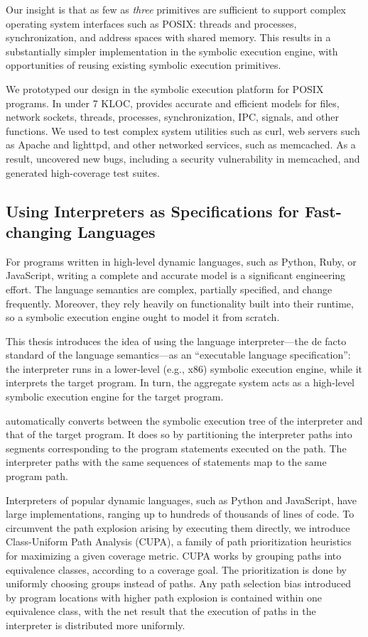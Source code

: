 Our insight is that as few as \emph{three} primitives are sufficient to support complex operating system interfaces such as POSIX: threads and processes, synchronization, and address spaces with shared memory.
%
This results in a substantially simpler implementation in the symbolic execution engine, with opportunities of reusing existing symbolic execution primitives.

We prototyped our design in the \emph{\cnine} symbolic execution platform for POSIX programs.  In under 7 KLOC, \cnine provides accurate and efficient models for files, network sockets, threads, processes, synchronization, IPC, signals, and other functions.
%
We used \cnine to test complex system utilities such as \textsf{curl}, web servers such as Apache and lighttpd, and other networked services, such as memcached.
%
As a result, \cnine uncovered new bugs, including a security vulnerability in memcached, and generated high-coverage test suites.


\subsection{Using Interpreters as Specifications for Fast-changing Languages}

For programs written in high-level dynamic languages, such as Python, Ruby, or JavaScript, writing a complete and accurate model is a significant engineering effort.
%
The language semantics are complex, partially specified, and change frequently.  Moreover, they rely heavily on functionality built into their runtime, so a symbolic execution engine ought to model it from scratch.

This thesis introduces the idea of using the language interpreter---the de facto standard of the language semantics---as an ``executable language specification'': the interpreter runs in a lower-level (e.g., x86) symbolic execution engine, while it interprets the target program.  In turn, the aggregate system acts as a high-level symbolic execution engine for the target program.

\chef automatically converts between the symbolic execution tree of the interpreter and that of the target program.
%
It does so by partitioning the interpreter paths into segments corresponding to the program statements executed on the path.  The interpreter paths with the same sequences of statements map to the same program path.

Interpreters of popular dynamic languages, such as Python and JavaScript, have large implementations, ranging up to hundreds of thousands of lines of code.
%
To circumvent the path explosion arising by executing them directly, we introduce Class-Uniform Path Analysis (CUPA), a family of path prioritization heuristics for maximizing a given coverage metric.
%
CUPA works by grouping paths into equivalence classes, according to a coverage goal.  The prioritization is done by uniformly choosing groups instead of paths.  Any path selection bias introduced by program locations with higher path explosion is contained within one equivalence class, with the net result that the execution of paths in the interpreter is distributed more uniformly.

